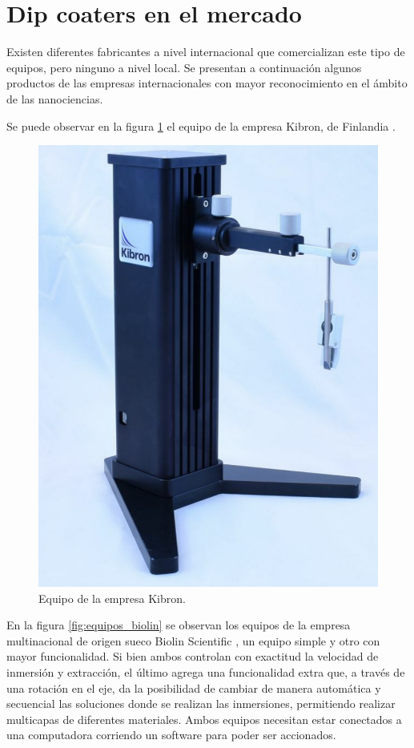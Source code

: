 \label{sec:dip coating}

\section{Dip coaters en el mercado}
\label{sec:mercado}
Existen diferentes fabricantes a nivel internacional que comercializan este tipo de equipos, pero ninguno a nivel local. Se presentan a continuación algunos productos de las empresas internacionales con mayor reconocimiento en el ámbito de las nanociencias. 

Se puede observar en la figura \ref{fig:dip_kibron} el equipo de la empresa Kibron, de Finlandia \citep{2_web_kibron}.

\begin{figure}[htbp]
	\centering
	\includegraphics[width=.35\textwidth]{./Figures/kibron.pdf}
	\caption{Equipo de la empresa Kibron.}
	\label{fig:dip_kibron}
\end{figure}

En la figura \ref{fig:equipos_biolin} se observan los equipos de la empresa multinacional de origen sueco Biolin Scientific  \citep{1_web_biolin}, un equipo simple y otro con mayor funcionalidad. Si bien ambos controlan con exactitud la velocidad de inmersión y extracción, el último agrega una funcionalidad extra que, a través de una rotación en el eje, da la posibilidad de cambiar de manera automática y secuencial las soluciones donde se realizan las inmersiones, permitiendo realizar multicapas de diferentes materiales. Ambos equipos necesitan estar conectados a una computadora corriendo un software para poder ser accionados.

